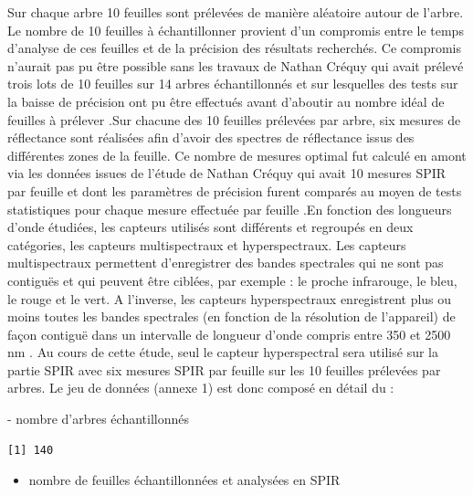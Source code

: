 \documentclass[
  11pt,
  french,
  a4paper,
  extrafontsizes,onecolumn,openright
  ]{memoir}
\providecommand{\tightlist}{%
  \setlength{\itemsep}{0pt}\setlength{\parskip}{0pt}}
\begin{document}
\normalsize

Sur chaque arbre 10 feuilles sont prélevées de manière aléatoire autour de l'arbre. Le nombre de 10 feuilles à échantillonner provient d'un compromis entre le temps d'analyse de ces feuilles et de la précision des résultats recherchés. Ce compromis n'aurait pas pu être possible sans les travaux de Nathan Créquy qui avait prélevé trois lots de 10 feuilles sur 14 arbres échantillonnés et sur lesquelles des tests sur la baisse de précision ont pu être effectués avant d'aboutir au nombre idéal de feuilles à prélever \autocite{crequy_prise_2020}.Sur chacune des 10 feuilles prélevées par arbre, six mesures de réflectance sont réalisées afin d'avoir des spectres de réflectance issus des différentes zones de la feuille. Ce nombre de mesures optimal fut calculé en amont via les données issues de l'étude de Nathan Créquy qui avait 10 mesures SPIR par feuille et dont les paramètres de précision furent comparés au moyen de tests statistiques pour chaque mesure effectuée par feuille \autocite{crequy_prise_2020}.En fonction des longueurs d'onde étudiées, les capteurs utilisés sont différents et regroupés en deux catégories, les capteurs multispectraux et hyperspectraux. Les capteurs multispectraux permettent d'enregistrer des bandes spectrales qui ne sont pas contiguës et qui peuvent être ciblées, par exemple : le proche infrarouge, le bleu, le rouge et le vert. A l'inverse, les capteurs hyperspectraux enregistrent plus ou moins toutes les bandes spectrales (en fonction de la résolution de l'appareil) de façon contiguë dans un intervalle de longueur d'onde compris entre 350 et 2500 nm \autocite{bertaux_mise_2015}. Au cours de cette étude, seul le capteur hyperspectral sera utilisé sur la partie SPIR avec six mesures SPIR par feuille sur les 10 feuilles prélevées par arbres.
Le jeu de données (annexe 1) est donc composé en détail du :

\scriptsize

\normalsize
- nombre d'arbres échantillonnés

\scriptsize

\begin{verbatim}
[1] 140
\end{verbatim}

\normalsize

\begin{itemize}
\tightlist
\item
  nombre de feuilles échantillonnées et analysées en SPIR
\end{itemize}
\end{document}
